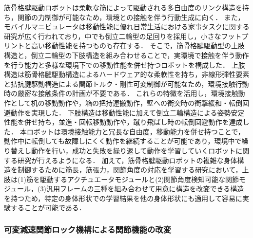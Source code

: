 \documentclass[twocolumn]{d-abst}
\begin{document}
筋骨格腱駆動ロボットは柔軟な筋によって駆動される多自由度のリンク構造を持ち，関節の力制御が可能なため，環境との接触を伴う行動生成に向く．
また，モバイルマニピュレータは移動性能に優れ日常生活における家事タスクに関する研究が広く行われており，中でも倒立二輪型の足回りを採用し，小さなフットプリントと高い移動性能を持つものも存在する．
そこで，筋骨格腱駆動型の上肢構造と，倒立二輪型の下肢構造を組み合わせることで，実環境で接触を伴う動作を行う能力と多様な環境下での移動性能を併せ持つロボットを構成した．
上肢構造は筋骨格腱駆動構造によるハードウェア的な柔軟性を持ち，非線形弾性要素と拮抗腱駆動構造による関節トルク・剛性可変制御が可能なため，環境接触行動時の厳密な接触条件の計画が不要である．
これらの特徴を活用し，環境接触動作として机の移動動作や，箱の把持運搬動作，壁への衝突時の衝撃緩和・転倒回避動作を実現した．
下肢構造は移動性能に加えて倒立二輪構造による姿勢安定性能を併せ持ち，並進・回転移動動作や，蹴り飛ばし時の転倒回避動作を達成した．
本ロボットは環境接触能力と冗長な自由度，移動能力を併せ持つことで，動作中に転倒しても故障しにくく動作を継続することが可能であり，環境中で繰り替えし動作を行い，成功と失敗を繰り返して動作を学習していくロボットに関する研究が行えるようになる．
加えて，筋骨格腱駆動ロボットの複雑な身体構造を制御するために筋長，筋張力，関節角度の対応を学習する研究において，上肢は(1)筋を駆動するアクチュエータモジュールと(2)関節角度検知可能な関節モジュール，(3)汎用フレームの三種を組み合わせて用意に構造を改変できる構造を持つため，特定の身体形状での学習結果を他の身体形状にも適用して容易に実験することが可能である．%

\subsubsection{可変減速関節ロック機構による関節機能の改変}
\end{document}
